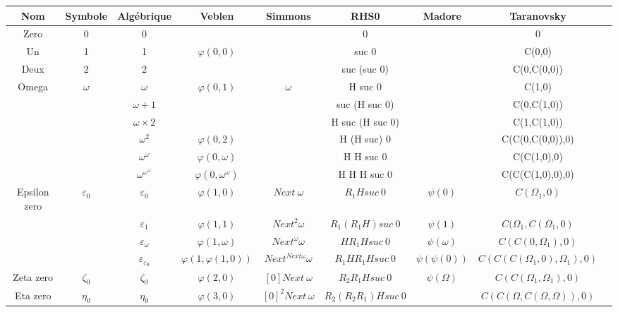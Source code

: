 \documentclass[8pt]{article}
\begin{document}
\begin{tabular}{|c|c|c|c|c|c|c|c|c|}
\hline
Nom		& Symbole		& Algébrique			& Veblen			& Simmons			& RHS0		& Madore				& Taranovsky 			\\
\hline
Zero		& 0			& 0				& 				& 				& 0			& 					& 0				\\ \hline
Un		& 1			& 1				& \(\varphi(0,0)\)		& 				& suc 0			& 					& C(0,0)			\\ \hline
Deux		& 2			& 2				& 				& 				& suc (suc 0)		& 					& C(0,C(0,0))			\\ \hline
Omega		& \(\omega\)		& \(\omega\)			& \(\varphi(0,1)\)		& \(\omega\)			& H suc 0		& 					& C(1,0)			\\ \hline
		& 			& \(\omega+1\)			& 				& 				& suc (H suc 0)		& 					& C(0,C(1,0))			\\ \hline
		&			& \(\omega\times2\)		&				& 				& H suc (H suc 0)	& 					& C(1,C(1,0))			\\ \hline
		&			& \(\omega^2\)			& \(\varphi(0,2)\)		& 				& H (H suc) 0		& 					& C(C(0,C(0,0)),0)		\\ \hline
		&			& \(\omega^\omega\)		& \(\varphi(0,\omega)\)		& 				& H H suc 0		& 					& C(C(1,0),0)			\\ \hline
		&			& \(\omega^{\omega^\omega}\)	& \(\varphi(0,\omega^\omega)\)	&				& H H H suc 0		&					& C(C(C(1,0),0),0)		\\ \hline
Epsilon zero	& \(\varepsilon_0\)	& \(\varepsilon_0\)		& \(\varphi(1,0)\)		& \(Next\ \omega\)		& \(R_1 H suc\ 0\)	& \(\psi(0)\)				& \(C(\Omega_1,0)\)		\\ \hline
		& 			& \(\varepsilon_1\)		& \(\varphi(1,1)\)		& \(Next^2 \omega\)	& \(R_1 (R_1 H) suc\ 0\)& \(\psi(1)\)				& \(C(\Omega_1,C(\Omega_1,0)\)	\\ \hline
		& 			& \(\varepsilon_\omega\)	& \(\varphi(1,\omega)\) 	& \(Next^\omega \omega\) & \(H R_1 H suc\ 0\)	& \(\psi(\omega)\)			& \(C(C(0,\Omega_1),0)\)	\\ \hline
		& 			&\(\varepsilon_{\varepsilon_0}\)& \(\varphi(1,\varphi(1,0))\)	& \(Next^{Next \omega} \omega \) & \(R_1 H R_1 H suc\ 0\)& \(\psi(\psi(0))\)			& \(C(C(C(\Omega_1,0),\Omega_1),0)\)\\ \hline
Zeta zero	& \(\zeta_0\)		& \(\zeta_0\)			& \(\varphi(2,0)\)		& \([0] Next\ \omega\)		& \(R_2 R_1 H suc\ 0\)	& \(\psi(\Omega)\)			& \(C(C(\Omega_1,\Omega_1),0)\)	\\ \hline
Eta zero	& \(\eta_0\)		& \(\eta_0\)			& \(\varphi(3,0)\)		& \([0]^2 Next\ \omega\) 	& \(R_2 (R_2 R_1) H suc\ 0\)&					& \(C(C(\Omega,C(\Omega,\Omega)),0)\) \\ \hline

\end{tabular}
\end{document}
